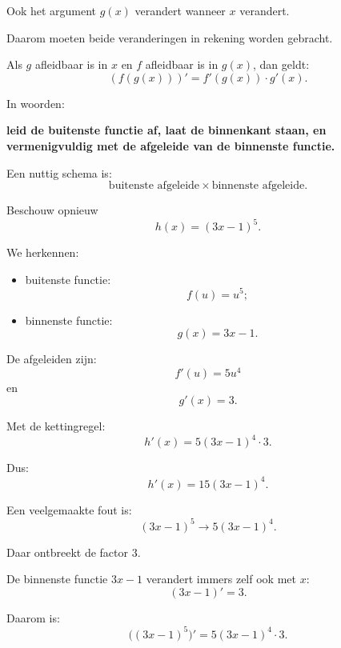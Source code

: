 \documentclass{ximera}
\begin{document}
Ook het argument $g(x)$ verandert wanneer $x$ verandert.

Daarom moeten beide veranderingen in rekening worden gebracht.


\begin{definitie}[Kettingregel]
Als $g$ afleidbaar is in $x$ en $f$ afleidbaar is in $g(x)$, dan geldt:
\[\boxed{(f(g(x)))'=f'(g(x))\cdot g'(x).}\]
\end{definitie}


In woorden:

\begin{center}
\textbf{leid de buitenste functie af, laat de binnenkant staan,
en vermenigvuldig met de afgeleide van de binnenste functie.}
\end{center}


Een nuttig schema is:
\[\boxed{\text{buitenste afgeleide}\times\text{binnenste afgeleide}.}\]




Beschouw opnieuw
\[h(x)=(3x-1)^5.\]

We herkennen:

\begin{itemize}
  \item buitenste functie:
        \[f(u)=u^5;\]
  \item binnenste functie:
        \[g(x)=3x-1.\]
\end{itemize}

De afgeleiden zijn:
\[f'(u)=5u^4\]
en
\[g'(x)=3.\]

Met de kettingregel:
\[
h'(x)
=
5(3x-1)^4\cdot3.
\]

Dus:
\[\boxed{h'(x)=15(3x-1)^4.}\]


\begin{opmerking}
Een veelgemaakte fout is:
\[(3x-1)^5\longrightarrow5(3x-1)^4.\]

Daar ontbreekt de factor $3$.

De binnenste functie $3x-1$ verandert immers zelf ook met $x$:
\[(3x-1)'=3.\]

Daarom is:
\[\boxed{\bigl((3x-1)^5\bigr)'=5(3x-1)^4\cdot3.}\]
\end{opmerking}


\end{document}
